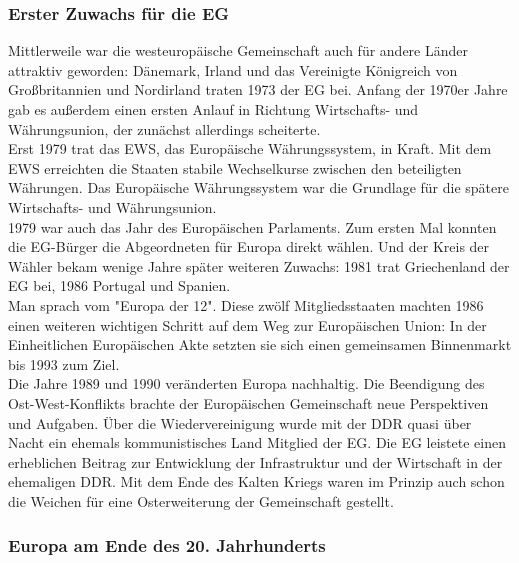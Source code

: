 \documentclass[letterpaper, 12pt]{article}
\let\tempsubsubsection\subsubsection
\renewcommand\subsubsection[1]{\vspace{0cm}\tempsubsubsection{#1}\vspace{0cm}}
\begin{document}
\subsubsection{Erster Zuwachs für die EG}

Mittlerweile war die westeuropäische Gemeinschaft auch für andere Länder attraktiv geworden: Dänemark, Irland und das Vereinigte Königreich von Großbritannien und Nordirland traten 1973 der EG bei. Anfang der 1970er Jahre gab es außerdem einen ersten Anlauf in Richtung Wirtschafts- und Währungsunion, der zunächst allerdings scheiterte. \\
Erst 1979 trat das EWS, das Europäische Währungssystem, in Kraft. Mit dem EWS erreichten die Staaten stabile Wechselkurse zwischen den beteiligten Währungen. Das Europäische Währungssystem war die Grundlage für die spätere Wirtschafts- und Währungsunion. \\
1979 war auch das Jahr des Europäischen Parlaments. Zum ersten Mal konnten die EG-Bürger die Abgeordneten für Europa direkt wählen. Und der Kreis der Wähler bekam wenige Jahre später weiteren Zuwachs: 1981 trat Griechenland der EG bei, 1986 Portugal und Spanien. \\
Man sprach vom "Europa der 12". Diese zwölf Mitgliedsstaaten machten 1986 einen weiteren wichtigen Schritt auf dem Weg zur Europäischen Union: In der Einheitlichen Europäischen Akte setzten sie sich einen gemeinsamen Binnenmarkt bis 1993 zum Ziel. \\
Die Jahre 1989 und 1990 veränderten Europa nachhaltig. Die Beendigung des Ost-West-Konflikts brachte der Europäischen Gemeinschaft neue Perspektiven und Aufgaben. Über die Wiedervereinigung wurde mit der DDR quasi über Nacht ein ehemals kommunistisches Land Mitglied der EG. Die EG leistete einen erheblichen Beitrag zur Entwicklung der Infrastruktur und der Wirtschaft in der ehemaligen DDR. Mit dem Ende des Kalten Kriegs waren im Prinzip auch schon die Weichen für eine Osterweiterung der Gemeinschaft gestellt. \\

\subsubsection{Europa am Ende des 20. Jahrhunderts}
\end{document}
